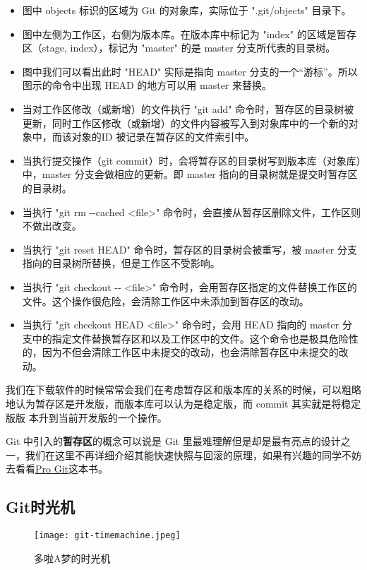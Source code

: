 \begin{itemize}
\item 图中 objects 标识的区域为 Git 的对象库，实际位于 ".git/objects" 目录下。
\item 图中左侧为工作区，右侧为版本库。在版本库中标记为 "index" 的区域是暂存区（stage, index），标记为 "master" 的是 master 分支所代表的目录树。
\item 图中我们可以看出此时 "HEAD" 实际是指向 master 分支的一个“游标”。所以图示的命令中出现 HEAD 的地方可以用 master 来替换。
\item 当对工作区修改（或新增）的文件执行 "git add" 命令时，暂存区的目录树被更新，同时工作区修改（或新增）的文件内容被写入到对象库中的一个新的对象中，而该对象的ID 被记录在暂存区的文件索引中。
\item 当执行提交操作（git commit）时，会将暂存区的目录树写到版本库（对象库）中，master 分支会做相应的更新。即 master 指向的目录树就是提交时暂存区的目录树。
\item 当执行 "git rm -{}-cached <file>" 命令时，会直接从暂存区删除文件，工作区则不做出改变。
\item 当执行 "git reset HEAD" 命令时，暂存区的目录树会被重写，被 master 分支指向的目录树所替换，但是工作区不受影响。
\item 当执行 "git checkout -{}- <file>" 命令时，会用暂存区指定的文件替换工作区的文件。这个操作很危险，会清除工作区中未添加到暂存区的改动。
\item 当执行 "git checkout HEAD <file>" 命令时，会用 HEAD 指向的 master 分支中的指定文件替换暂存区和以及工作区中的文件。这个命令也是极具危险性的，因为不但会清除工作区中未提交的改动，也会清除暂存区中未提交的改动。
\end{itemize}

我们在下载软件的时候常常会我们在考虑暂存区和版本库的关系的时候，可以粗略 地认为暂存区是开发版，而版本库可以认为是稳定版，而 commit 其实就是将稳定版版 本升到当前开发版的一个操作。

Git 中引入的\textbf{暂存区}的概念可以说是 Git 里最难理解但是却是最有亮点的设计之一，我们在这里不再详细介绍其能快速快照与回滚的原理，如果有兴趣的同学不妨去看看\href{http://download.csdn.net/detail/shuangde800/5977817}{Pro Git}这本书。

\subsection{Git时光机}
\begin{figure}[htbp]
	\centering
	\texttt{[image: git-timemachine.jpeg]}
	\caption{多啦A梦的时光机}
\end{figure}


